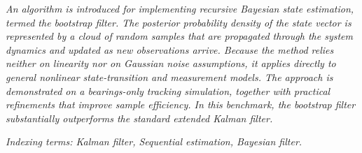 \emph{An algorithm is introduced for implementing recursive Bayesian state estimation, termed the bootstrap filter. The posterior probability density of the state vector is represented by a cloud of random samples that are propagated through the system dynamics and updated as new observations arrive. Because the method relies neither on linearity nor on Gaussian noise assumptions, it applies directly to general nonlinear state-transition and measurement models. The approach is demonstrated on a bearings-only tracking simulation, together with practical refinements that improve sample efficiency. In this benchmark, the bootstrap filter substantially outperforms the standard extended Kalman filter.}

\emph{Indexing terms: Kalman filter, Sequential estimation, Bayesian filter.}

